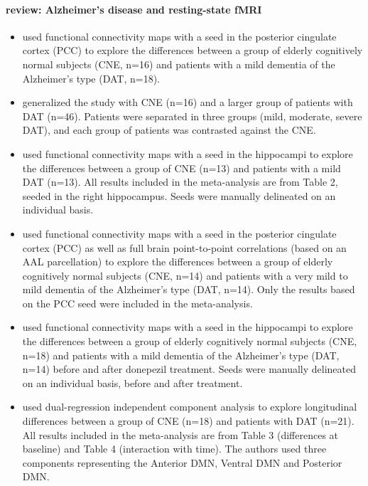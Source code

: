 \documentclass[authoryear]{elsarticle}
\begin{document}
\paragraph{review: Alzheimer's disease and resting-state fMRI} 
\begin{itemize}
\item \cite{Zhang2009a} used functional connectivity maps with a seed in the posterior cingulate cortex (PCC) to explore the differences between a group of elderly cognitively normal subjects (CNE, n=16) and patients with a mild dementia of the Alzheimer's type (DAT, n=18).
\item \cite{Zhang2010} generalized the \cite{Zhang2009a} study with CNE (n=16) and a larger group of patients with DAT (n=46). Patients were separated in three groups (mild, moderate, severe DAT), and each group of patients was contrasted against the CNE.
\item \cite{Wang2006a} used functional connectivity maps with a seed in the hippocampi to explore the differences between a group of CNE (n=13) and patients with a mild DAT (n=13). All results included in the meta-analysis are from Table 2, seeded in the right hippocampus. Seeds were manually delineated on an individual basis.
\item \cite{Wang2007a} used functional connectivity maps with a seed in the posterior cingulate cortex (PCC) as well as full brain point-to-point correlations (based on an AAL parcellation) to explore the differences between a group of elderly cognitively normal subjects (CNE, n=14) and patients with a very mild to mild dementia of the Alzheimer's type (DAT, n=14). Only the results based on the PCC seed were included in the meta-analysis.
\item \cite{Goveas2011} used functional connectivity maps with a seed in the hippocampi to explore the differences between a group of elderly cognitively normal subjects (CNE, n=18) and patients with a mild dementia of the Alzheimer's type (DAT, n=14) before and after donepezil treatment. Seeds were manually delineated on an individual basis, before and after treatment.
\item \cite{Damoiseaux2012} used dual-regression independent component analysis to explore longitudinal differences between a group of CNE (n=18) and patients with DAT (n=21). All results included in the meta-analysis are from Table 3 (differences at baseline) and Table 4 (interaction with time). The authors used three components representing the Anterior DMN, Ventral DMN and Posterior DMN.
\end{itemize}
\end{document}
